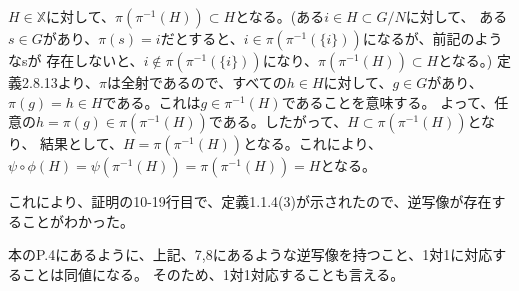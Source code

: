 \documentclass{jsarticle}
\begin{document}
$H \in \mathbb{X}$に対して、$\pi(\pi^{-1}(H)) \subset H$となる。(ある$i \in H \subset G/N$に対して、
ある$s \in G$があり、$\pi(s) = i$だとすると、$i \in \pi(\pi^{-1}(\{i\}))$になるが、前記のようなsが
存在しないと、$i \notin \pi(\pi^{-1}(\{i\}))$になり、$\pi(\pi^{-1}(H)) \subset H$となる。)
定義2.8.13より、$\pi$は全射であるので、すべての$h \in H$に対して、$g \in G$があり、
$\pi(g) = h \in H$である。これは$g \in \pi^{-1}(H)$であることを意味する。
よって、任意の$h = \pi(g) \in \pi(\pi^{-1}(H))$である。したがって、$H \subset \pi(\pi^{-1}(H))$となり、
結果として、$H = \pi(\pi^{-1}(H))$となる。これにより、$\psi \circ \phi(H) = \psi(\pi^{-1}(H)) = 
\pi(\pi^{-1}(H)) = H$となる。

これにより、証明の10-19行目で、定義1.1.4(3)が示されたので、逆写像が存在することがわかった。

本のP.4にあるように、上記、7,8にあるような逆写像を持つこと、1対1に対応することは同値になる。
そのため、1対1対応することも言える。
\end{document}
